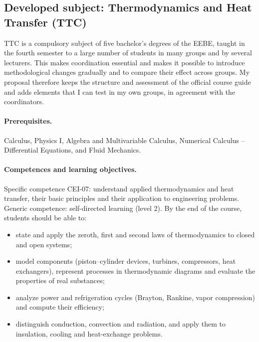 \documentclass[11pt]{article}
\begin{document}
\subsection{Developed subject: Thermodynamics and Heat Transfer (TTC)}\label{sec:ttc}
TTC is a compulsory subject of five bachelor's degrees of the EEBE, taught in the fourth
semester to a large number of students in many groups and by several lecturers. This
makes coordination essential and makes it possible to introduce methodological changes
gradually and to compare their effect across groups. My proposal therefore keeps the
structure and assessment of the official course guide and adds elements that I can test
in my own groups, in agreement with the coordinators.

\paragraph{Prerequisites.} Calculus, Physics I, Algebra and Multivariable Calculus,
Numerical Calculus -- Differential Equations, and Fluid Mechanics.

\paragraph{Competences and learning objectives.} Specific competence CEI-07: understand
applied thermodynamics and heat transfer, their basic principles and their application to
engineering problems. Generic competence: self-directed learning (level 2). By the end of
the course, students should be able to:
\begin{itemize}
  \item state and apply the zeroth, first and second laws of thermodynamics to closed and
  open systems;
  \item model components (piston--cylinder devices, turbines, compressors, heat
  exchangers), represent processes in thermodynamic diagrams and evaluate the properties of
  real substances;
  \item analyze power and refrigeration cycles (Brayton, Rankine, vapor compression) and
  compute their efficiency;
  \item distinguish conduction, convection and radiation, and apply them to insulation,
  cooling and heat-exchange problems.
\end{itemize}
\end{document}
